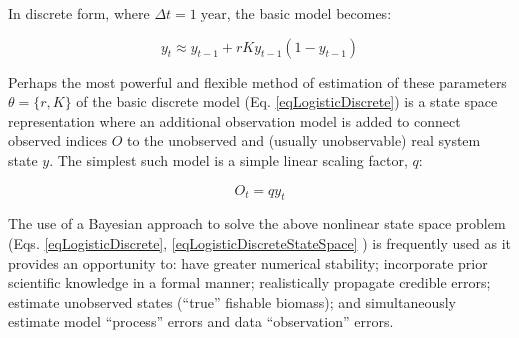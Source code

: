 \documentclass[letterpaper,portrait,11pt]{scrartcl}
\numberwithin{equation}{section}		%
\numberwithin{figure}{section}			%
\numberwithin{table}{section}				%
\begin{document}
\begin{itemize*}
In discrete form, where $\Delta t = 1 \; \text{year}$, the basic model becomes:

\begin{equation} 
\label{eqLogisticDiscrete}
y_t  \approx y_{t-1} + r K y_{t-1} (1 - y_{t-1} )
\end{equation}

Perhaps the most powerful and flexible method of estimation of these parameters $\theta = \{r, K \}$ of the basic discrete model (Eq. \ref{eqLogisticDiscrete}) is a state space representation where an additional observation model is added to connect observed indices $O$ to the unobserved and (usually unobservable) real system state $y$. The simplest such model is a simple linear scaling factor, $q$: 

\begin{equation} 
\label{eqLogisticDiscreteStateSpace}
O_t = q y_t
\end{equation}


The use of a Bayesian approach to solve the above nonlinear state space problem (Eqs. \ref{eqLogisticDiscrete}, \ref{eqLogisticDiscreteStateSpace} ) is frequently used as it provides an opportunity to: have greater numerical stability;  incorporate prior scientific knowledge in a formal manner; realistically propagate credible errors; estimate unobserved states (“true” fishable biomass); and simultaneously estimate model “process” errors and data “observation” errors. 


\end{itemize*}
\end{document}
